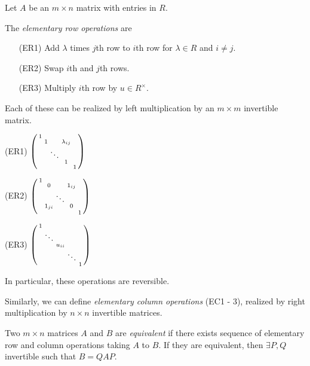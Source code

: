 Let \(A\) be an \(m \times n\) matrix with entries in \(R\).
\begin{definition}{}{}
    The \textit{elementary row operations} are
    \begin{enumerate}
        \item[(ER1)] Add \(\lambda\) times \(j\)th row to \(i\)th row for \(\lambda \in R\) and \(i \neq j\).
        \item[(ER2)] Swap \(i\)th and \(j\)th rows.
        \item[(ER3)] Multiply \(i\)th row by \(u \in R^\times\).
    \end{enumerate}
    Each of these can be realized by left multiplication by an \(m \times m\) invertible matrix.
    
    \begin{enumerate*}
        \item[(ER1)] \(\begin{psmallmatrix}
            1 &  &  &  &   \\
             & 1 &  & \lambda_{ij} &   \\
             &  & \ddots & &   \\
             &  &  & 1 &   \\
             &  &  &  & 1  \\
        \end{psmallmatrix}\)
        \item[(ER2)] \(\begin{psmallmatrix}
            1 &  &  &  &   \\
             & 0 &  & 1_{ij} &   \\
             &  & \ddots &  &   \\
             & 1_{ji} &  & 0 &   \\
             &  &  &  &  1 \\
        \end{psmallmatrix}\)
        \item[(ER3)] \(\begin{psmallmatrix}
            1 &  &  &  &   \\
             & \ddots &  &  &   \\
             &  & u_{ii} &  &   \\
             &  &  & \ddots &   \\
             &  &  &  &  1 \\
        \end{psmallmatrix}\)
    \end{enumerate*}

    In particular, these operations are reversible.

    Similarly, we can define \textit{elementary column operations} (EC1 - 3), realized by right multiplication by \(n \times n\) invertible matrices.
\end{definition}
\begin{definition}{}{}
    Two \(m \times n\) matrices \(A\) and \(B\) are \textit{equivalent} if there exists sequence of elementary row and column operations taking \(A\) to \(B\). If they are equivalent, then \(\exists P, Q\) invertible such that \(B = QAP\).
\end{definition}